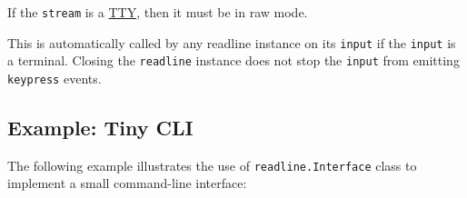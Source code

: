 If the \texttt{stream} is a \href{tty.md}{TTY}, then it must be in raw
mode.

This is automatically called by any readline instance on its
\texttt{input} if the \texttt{input} is a terminal. Closing the
\texttt{readline} instance does not stop the \texttt{input} from
emitting \texttt{\textquotesingle{}keypress\textquotesingle{}} events.

\begin{Shaded}
\begin{Highlighting}[]
\NormalTok{(}\NormalTok{)}\OperatorTok{;}
\NormalTok{ (}\NormalTok{)}
  \NormalTok{(}\NormalTok{)}\OperatorTok{;}
\end{Highlighting}
\end{Shaded}

\subsection{Example: Tiny CLI}\label{example-tiny-cli}

The following example illustrates the use of \texttt{readline.Interface}
class to implement a small command-line interface:

